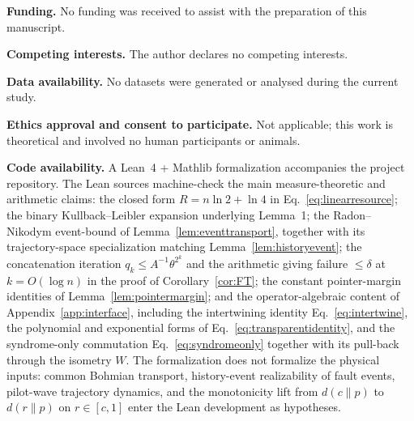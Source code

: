 \documentclass[pdflatex,sn-mathphys-num]{sn-jnl}
\theoremstyle{thmstyleone}
\begin{document}
\noindent\textbf{Funding.} No funding was received to assist with the preparation of this manuscript.

\medskip
\noindent\textbf{Competing interests.} The author declares no competing interests.

\medskip
\noindent\textbf{Data availability.} No datasets were generated or analysed during the current study.

\medskip
\noindent\textbf{Ethics approval and consent to participate.} Not applicable; this work is theoretical and involved no human participants or animals.

\medskip
\noindent\textbf{Code availability.} A Lean~4 + Mathlib formalization accompanies the project repository. The Lean sources machine-check the main measure-theoretic and arithmetic claims: the closed form $R=n\ln2+\ln4$ in Eq.~\eqref{eq:linearresource}; the binary Kullback--Leibler expansion underlying Lemma~1; the Radon--Nikodym event-bound of Lemma~\ref{lem:eventtransport}, together with its trajectory-space specialization matching Lemma~\ref{lem:historyevent}; the concatenation iteration $q_k\le A^{-1}\theta^{2^k}$ and the arithmetic giving failure $\le\delta$ at $k=O(\log n)$ in the proof of Corollary~\ref{cor:FT}; the constant pointer-margin identities of Lemma~\ref{lem:pointermargin}; and the operator-algebraic content of Appendix~\ref{app:interface}, including the intertwining identity Eq.~\eqref{eq:intertwine}, the polynomial and exponential forms of Eq.~\eqref{eq:transparentidentity}, and the syndrome-only commutation Eq.~\eqref{eq:syndromeonly} together with its pull-back through the isometry $W$. The formalization does not formalize the physical inputs: common Bohmian transport, history-event realizability of fault events, pilot-wave trajectory dynamics, and the monotonicity lift from $d(c\|p)$ to $d(r\|p)$ on $r\in[c,1]$ enter the Lean development as hypotheses.
\end{document}

